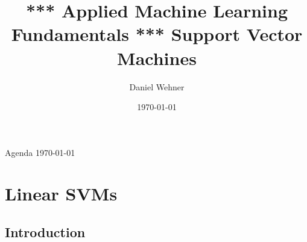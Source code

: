 


\title[Support Vector Machines]{*** Applied Machine Learning Fundamentals *** Support Vector Machines}
\author{Daniel Wehner}
\date{\today}




\maketitlepage


\begin{frame}{Agenda \today}
	\begin{multicols}{2}
		\tableofcontents
	\end{multicols}
\end{frame}


\section{Linear SVMs}

\subsection{Introduction}

